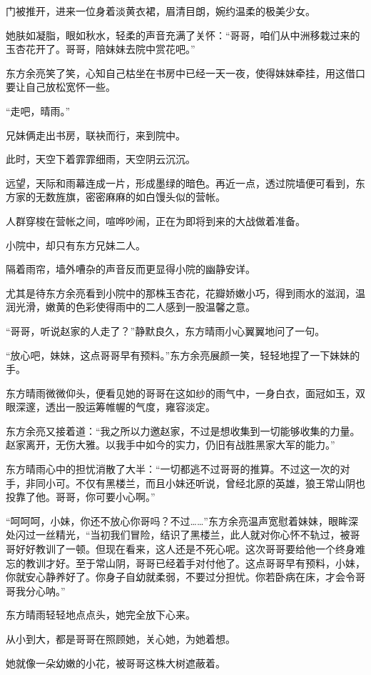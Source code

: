 \begin{this_body}
门被推开，进来一位身着淡黄衣裙，眉清目朗，婉约温柔的极美少女。

她肤如凝脂，眼如秋水，轻柔的声音充满了关怀：“哥哥，咱们从中洲移栽过来的玉杏花开了。哥哥，陪妹妹去院中赏花吧。”

东方余亮笑了笑，心知自己枯坐在书房中已经一天一夜，使得妹妹牵挂，用这借口要让自己放松宽怀一些。

“走吧，晴雨。”

兄妹俩走出书房，联袂而行，来到院中。

此时，天空下着霏霏细雨，天空阴云沉沉。

远望，天际和雨幕连成一片，形成墨绿的暗色。再近一点，透过院墙便可看到，东方家的无数旌旗，密密麻麻的如白馒头似的营帐。

人群穿梭在营帐之间，喧哗吵闹，正在为即将到来的大战做着准备。

小院中，却只有东方兄妹二人。

隔着雨帘，墙外嘈杂的声音反而更显得小院的幽静安详。

尤其是待东方余亮看到小院中的那株玉杏花，花瓣娇嫩小巧，得到雨水的滋润，温润光滑，嫩黄的色彩使得雨中的二人感到一股温馨之意。

“哥哥，听说赵家的人走了？”静默良久，东方晴雨小心翼翼地问了一句。

“放心吧，妹妹，这点哥哥早有预料。”东方余亮展颜一笑，轻轻地捏了一下妹妹的手。

东方晴雨微微仰头，便看见她的哥哥在这如纱的雨气中，一身白衣，面冠如玉，双眼深邃，透出一股运筹帷幄的气度，雍容淡定。

东方余亮又接着道：“我之所以力邀赵家，不过是想收集到一切能够收集的力量。赵家离开，无伤大雅。以我手中如今的实力，仍旧有战胜黑家大军的能力。”

东方晴雨心中的担忧消散了大半：“一切都逃不过哥哥的推算。不过这一次的对手，非同小可。不仅有黑楼兰，而且小妹还听说，曾经北原的英雄，狼王常山阴也投靠了他。哥哥，你可要小心啊。”

“呵呵呵，小妹，你还不放心你哥吗？不过……”东方余亮温声宽慰着妹妹，眼眸深处闪过一丝精光，“当初我们冒险，结识了黑楼兰，此人就对你心怀不轨过，被哥哥好好教训了一顿。但现在看来，这人还是不死心呢。这次哥哥要给他一个终身难忘的教训才好。至于常山阴，哥哥已经着手对付他了。这点哥哥早有预料，小妹，你就安心静养好了。你身子自幼就柔弱，不要过分担忧。你若卧病在床，才会令哥哥我分心呐。”

东方晴雨轻轻地点点头，她完全放下心来。

从小到大，都是哥哥在照顾她，关心她，为她着想。

她就像一朵幼嫩的小花，被哥哥这株大树遮蔽着。


\end{this_body}
